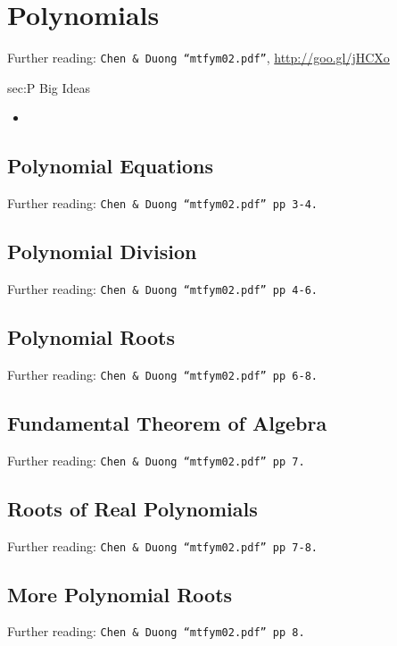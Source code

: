\chapter{Polynomials}
\label{chap:P}
Further reading: \texttt{Chen \& Duong ``mtfym02.pdf''}, \url{http://goo.gl/jHCXo}

\begin{bigideas}{sec:P Big Ideas}
\begin{itemize}
  \item 
\end{itemize}
\end{bigideas}

\section{Polynomial Equations}
\label{sec:P Polynomial Equations}
Further reading: \texttt{Chen \& Duong ``mtfym02.pdf'' pp 3-4.}

\section{Polynomial Division}
\label{sec:P Polynomial Division}
Further reading: \texttt{Chen \& Duong ``mtfym02.pdf'' pp 4-6.}

\section{Polynomial Roots}
\label{sec:P Polynomial Root}
Further reading: \texttt{Chen \& Duong ``mtfym02.pdf'' pp 6-8.}

\section{Fundamental Theorem of Algebra}
\label{sec:P Fundamental Theorem of Algebra}
Further reading: \texttt{Chen \& Duong ``mtfym02.pdf'' pp 7.}

\section{Roots of Real Polynomials}
\label{sec:P Roots of Real Polynomial}
Further reading: \texttt{Chen \& Duong ``mtfym02.pdf'' pp 7-8.}

\section{More Polynomial Roots}
\label{sec:P More Polynomial Root}
Further reading: \texttt{Chen \& Duong ``mtfym02.pdf'' pp 8.}

